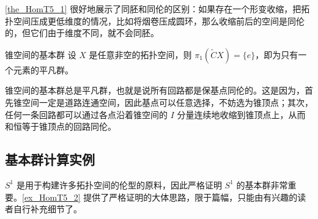 \autoref{the_HomT5_1} 很好地展示了同胚和同伦的区别：如果存在一个形变收缩，把拓扑空间压成更低维度的情况，比如将烟卷压成圆环，那么收缩前后的空间是同伦的，但它们由于维度不同，就不会同胚。

\begin{theorem}{锥空间的基本群}
设 $X$ 是任意非空的拓扑空间，则 $\pi_1(\widetilde{C}X)=\{e\}$，即为只有一个元素的平凡群。
\end{theorem}

锥空间的基本群总是平凡群，也就是说所有回路都是保基点同伦的。这是因为，首先锥空间一定是道路连通空间，因此基点可以任意选择，不妨选为锥顶点；其次，任何一条回路都可以通过各点沿着锥空间的 $I$ 分量连续地收缩到锥顶点上，从而和恒等于锥顶点的回路同伦。



\subsection{基本群计算实例}


$S^1$ 是用于构建许多拓扑空间的伦型的原料，因此严格证明 $S^1$ 的基本群非常重要。\autoref{ex_HomT5_2} 提供了严格证明的大体思路，限于篇幅，只能由有兴趣的读者自行补充细节了。


